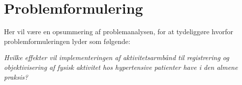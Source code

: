\section{Problemformulering}

Her vil være en opsummering af problemanalysen, for at tydeliggøre hvorfor problemformuleringen lyder som følgende:

\textit{Hvilke effekter vil implementeringen af aktivitetsarmbånd til registrering og objektivisering af fysisk aktivitet hos hypertensive patienter have i den almene praksis?}